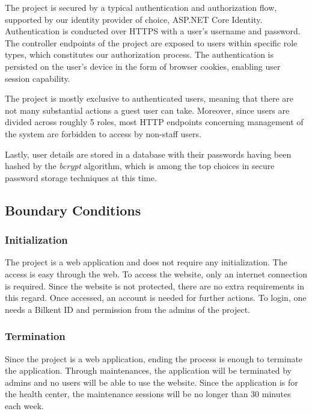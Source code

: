 \documentclass[a4paper, 12pt, titlepage]{article}
\begin{document}
  The project is secured by a typical authentication and authorization flow,
  supported by our identity provider of choice, ASP.NET Core Identity.
  Authentication is conducted over HTTPS with a user's username and password.
  The controller endpoints of the project are exposed to users within specific role types,
  which constitutes our authorization process.
  The authentication is persisted on the user's device in the form of browser cookies, enabling user session capability.

  The project is mostly exclusive to authenticated users, meaning that there are not many substantial actions a guest user can take.
  Moreover, since users are divided across roughly 5 roles,
  most HTTP endpoints concerning management of the system are forbidden to access by non-staff users.

  Lastly, user details are stored in a database with their passwords having been hashed by the \textit{bcrypt} algorithm,
  which is among the top choices in secure password storage techniques at this time.

  \subsection{Boundary Conditions}

  \subsubsection{Initialization}

  The project is a web application and does not require any initialization.
  The access is easy through the web.
  To access the website, only an internet connection is required.
  Since the website is not protected, there are no extra requirements in this regard.
  Once accessed, an account is needed for further actions.
  To login, one needs a Bilkent ID and permission from the admins of the project.

  \subsubsection{Termination}

  Since the project is a web application, ending the process is enough to terminate the application.
  Through maintenances, the application will be terminated by admins and no users will be able to use the website.
  Since the application is for the health center, the maintenance sessions will be no longer than 30 minutes each week.
\end{document}
